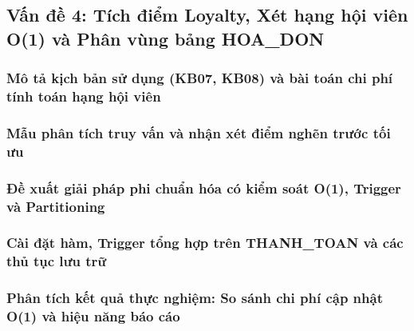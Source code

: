 \subsection{Vấn đề 4: Tích điểm Loyalty, Xét hạng hội viên O(1) và Phân vùng bảng HOA\_DON}

\subsubsection{Mô tả kịch bản sử dụng (KB07, KB08) và bài toán chi phí tính toán hạng hội viên}

\subsubsection{Mẫu phân tích truy vấn và nhận xét điểm nghẽn trước tối ưu}

\subsubsection{Đề xuất giải pháp phi chuẩn hóa có kiểm soát O(1), Trigger và Partitioning}

\subsubsection{Cài đặt hàm, Trigger tổng hợp trên THANH\_TOAN và các thủ tục lưu trữ}

\subsubsection{Phân tích kết quả thực nghiệm: So sánh chi phí cập nhật O(1) và hiệu năng báo cáo}
